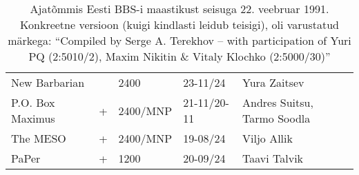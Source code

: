 \begin{table*}
\begin{tabular}{llp{2cm}p{2cm}p{5cm}}
New Barbarian                  &      & 2400               & 23-11/24                                      & Yura Zaitsev\index[ppl]{Zaitsev, Yura}                \\
P.O. Box Maximus               & +    & 2400/MNP           & 21-11/20-11                                   & Andres Suitsu\index[ppl]{Suitsu, Andrus}, Tarmo Soodla\index[ppl]{Soodla, Tarmo}  \\
The MESO                       & +    & 2400/MNP           & 19-08/24                                      & Viljo Allik\index[ppl]{Allik, Viljo}                 \\
PaPer                          & +    & 1200               & 20-09/24                                      & Taavi Talvik\index[ppl]{Talvik, Taavi}               \\
\bottomrule
\end{tabular}
\caption{Ajatõmmis Eesti BBS-i maastikust seisuga 22. veebruar 1991. Konkreetne versioon (kuigi kindlasti leidub teisigi), oli varustatud märkega: \enquote{Compiled   by   Serge   A.   Terekhov   --    with
participation of Yuri PQ  (2:5010/2),  Maxim Nikitin  \&
Vitaly Klochko (2:5000/30)}}
\end{table*}